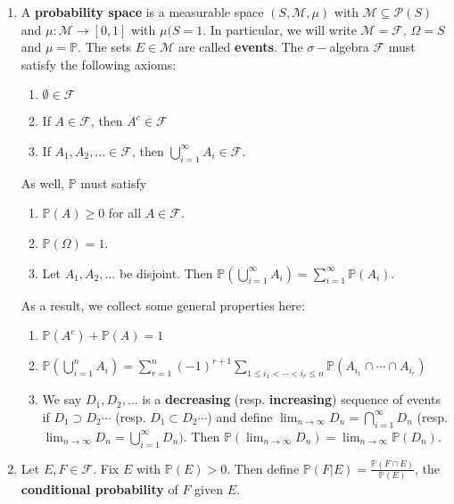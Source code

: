 \documentclass[12pt, a4paper]{article}
\renewcommand{\Pr}{\mathbb{P}}
\theoremstyle{nonumberplain}
\begin{document}
\begin{enumerate}
    \item A \textbf{probability space} is a measurable space $(S,\mathcal{M},\mu)$ with $\mathcal{M}\subseteq\mathcal{P}(S)$ and $\mu:\mathcal{M}\to[0,1]$ with $\mu(S=1$.
        In particular, we will write $\mathcal{M}=\mathcal{F}$, $\Omega=S$ and $\mu=\Pr$.
        The sets $E\in\mathcal{M}$ are called \textbf{events}.
        The $\sigma-$algebra $\mathcal{F}$ must satisfy the following axioms:
        \begin{enumerate}
            \item $\emptyset\in\mathcal{F}$
            \item If $A\in\mathcal{F}$, then $A^c\in\mathcal{F}$
            \item If $A_1,A_2,\ldots\in\mathcal{F}$, then $\bigcup\limits_{i=1}^\infty A_i\in\mathcal{F}$.
        \end{enumerate}
        As well, $\Pr$ must satisfy
        \begin{enumerate}
            \item $\Pr(A)\geq 0$ for all $A\in\mathcal{F}$.
            \item $\Pr(\Omega)=1$.
            \item Let $A_1,A_2,\ldots$ be disjoint.
                Then $\Pr\left(\bigcup\limits_{i=1}^\infty A_i\right)=\sum\limits_{i=1}^\infty \Pr(A_i)$.
        \end{enumerate}
        As a result, we collect some general properties here:
        \begin{enumerate}
            \item $\Pr(A^c)+\Pr(A)=1$
            \item $\displaystyle\Pr\left(\bigcup\limits_{i=1}^n A_i\right)=\sum\limits_{r=1}^n(-1)^{r+1}\sum\limits_{1\leq i_1<\cdots<i_r\leq n}\Pr(A_{i_1}\cap\cdots\cap A_{i_r})$
            \item We say $D_1,D_2,\ldots$ is a \textbf{decreasing} (resp. \textbf{increasing}) sequence of events if $D_1\supset D_2\cdots$ (resp. $D_1\subset D_2\cdots$) and define $\lim_{n\to\infty}D_n=\bigcap\limits_{i=1}^\infty D_n$ (resp. $\lim_{n\to\infty}D_n=\bigcup\limits_{i=1}^\infty D_n)$.
                Then $\Pr\left(\lim_{n\to\infty}D_n\right)=\lim_{n\to\infty}\Pr(D_n)$.
        \end{enumerate}
    \item Let $E,F\in\mathcal{F}$.
        Fix $E$ with $\Pr(E)>0$.
        Then define $\Pr(F|E)=\frac{\Pr(F\cap E)}{\Pr(E)}$, the \textbf{conditional probability} of $F$ given $E$.

\end{enumerate}
\end{document}
